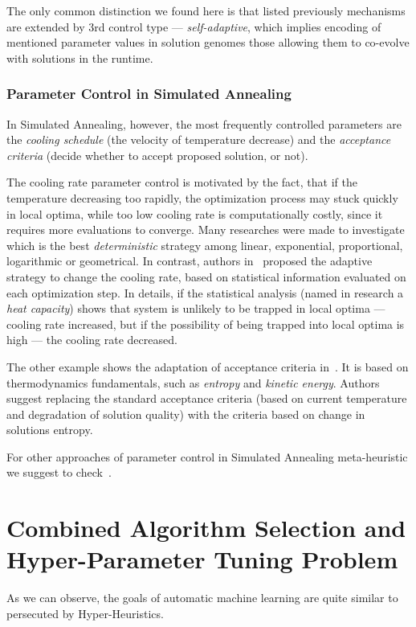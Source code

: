 The only common distinction we found here is that listed previously mechanisms are extended by 3rd control type — \textit{self-adaptive}, which implies encoding of mentioned parameter values in solution genomes those allowing them to co-evolve with solutions in the runtime.

\subsubsection{Parameter Control in Simulated Annealing}\label{bg: parameter control: SA}
In Simulated Annealing, however, the most frequently controlled parameters are the \textit{cooling schedule} (the velocity of temperature decrease) and the \textit{acceptance criteria} (decide whether to accept proposed solution, or not).

The cooling rate parameter control is motivated by the fact, that if the temperature decreasing too rapidly, the optimization process may stuck quickly in local optima, while too low cooling rate is computationally costly, since it requires more evaluations to converge. Many researches were made to investigate which is the best \textit{deterministic} strategy among linear, exponential, proportional, logarithmic or geometrical. In contrast, authors in~\cite{karabin2020simulated} proposed the adaptive strategy to change the cooling rate, based on statistical information evaluated on each optimization step. In details, if the statistical analysis (named in research a \textit{heat capacity}) shows that system is unlikely to be trapped in local optima — cooling rate increased, but if the possibility of being trapped into local optima is high — the cooling rate decreased.

The other example shows the adaptation of acceptance criteria in~\cite{ghandeshtani2019entropy}. It is based on thermodynamics fundamentals, such as \textit{entropy} and \textit{kinetic energy}. Authors suggest replacing the standard acceptance criteria (based on current temperature and degradation of solution quality) with the criteria based on change in solutions entropy.

For other approaches of parameter control in Simulated Annealing meta-heuristic we suggest to check~\cite{ingber2000adaptive,de2003placement}.


\section{Combined Algorithm Selection and Hyper-Parameter Tuning Problem}\label{bg: section cash}
As we can observe, the goals of automatic machine learning are quite similar to persecuted by Hyper-Heuristics.

